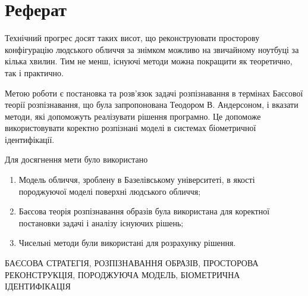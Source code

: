 \chapter*{Реферат}

Технічний прогрес досят таких висот,
що реконструювати просторову конфігурацію людського обличчя за знімком
можливо на звичайному ноутбуці за кілька хвилин.
Тим не менш, існуючі методи можна покращити як теоретично, так і практично.

Метою роботи є постановка та розв'язок задачі розпізнавання
в термінах Баєсової теорії розпізнавання,
що була запропонована Теодором В. Андерсоном,
і вказати методи, які допоможуть реалізувати рішення програмно.
Це допоможе використовувати коректно розпізнані моделі
в системах біометричної ідентифікації.

Для досягнення мети було використано
\begin{enumerate}
  \item
    Модель обличчя, зроблену в Базелівському університеті,
    в якості породжуючої моделі поверхні людського обличчя;
  \item
    Баєсова теорія розпізнавання образів була використана
    для коректної постановки задачі і аналізу існуючих рішень;
  \item
    Чисельні методи були використані для розрахунку рішення.
\end{enumerate}

\MakeUppercase{Баєсова стратегія, розпізнавання образів,
просторова реконструкція, породжуюча модель,
біометрична ідентифікація}
